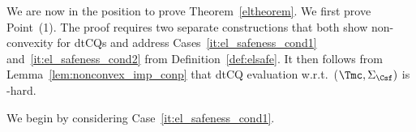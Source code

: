 \documentclass{lmcs}
\theoremstyle{definition}
\begin{document}
We are now in the position to prove Theorem~\ref{eltheorem}. We first prove Point~(1).
The proof requires two separate constructions that both show non-convexity for dtCQs and address 
Cases~\ref{it:el_safeness_cond1} and~\ref{it:el_safeness_cond2} from 
Definition~\ref{def:elsafe}. It then follows from Lemma~\ref{lem:nonconvex_imp_conp} that
dtCQ evaluation w.r.t.~($\Tmc,\Sigma_{\Csf})$ is \conp-hard.

We begin by considering Case~\ref{it:el_safeness_cond1}.
\end{document}
